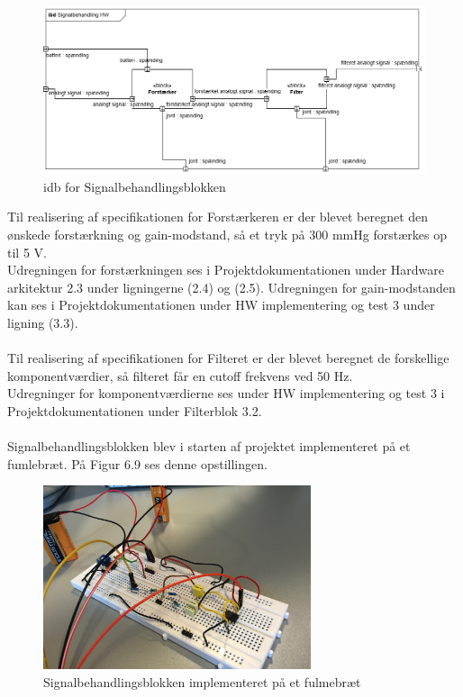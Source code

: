 \begin{figure}[H]
	\centering
	\includegraphics[width=1\textwidth]{Figurer/5}
	\caption{idb for Signalbehandlingsblokken}
\end{figure}

Til realisering af specifikationen for Forstærkeren er der blevet beregnet den ønskede forstærkning og gain-modstand, så et tryk på 300 mmHg forstærkes op til 5 V.\\
Udregningen for forstærkningen ses i Projektdokumentationen under Hardware arkitektur 2.3 under ligningerne (2.4) og (2.5). Udregningen for gain-modstanden kan ses i Projektdokumentationen under HW implementering og test 3 under ligning (3.3).  
\\\\
Til realisering af specifikationen for Filteret er der blevet beregnet de forskellige komponentværdier, så filteret får en cutoff frekvens ved 50 Hz.\\
Udregninger for komponentværdierne ses under HW implementering og test 3 i Projektdokumentationen under Filterblok 3.2. 
\\\\ 
Signalbehandlingsblokken blev i starten af projektet implementeret på et fumlebræt. På Figur 6.9 ses denne opstillingen. 

\begin{figure}[H]
	\centering
	\includegraphics[width=0.7\textwidth]{Figurer/Snip20151213_83}
	\caption{Signalbehandlingsblokken implementeret på et fulmebræt}
\end{figure} 

